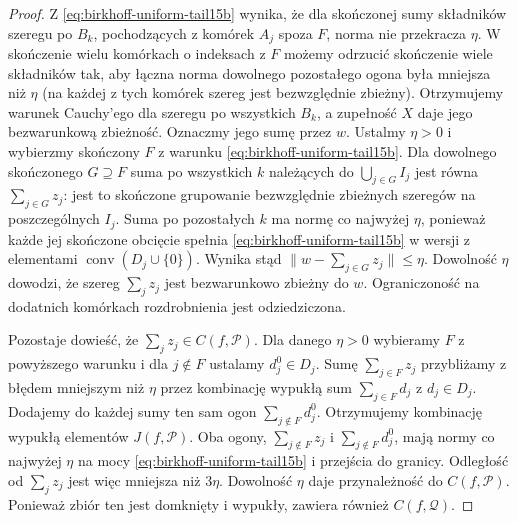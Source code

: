 \begin{proof}
Z \eqref{eq:birkhoff-uniform-tail15b} wynika, że
dla skończonej sumy składników szeregu po $B_k$,
pochodzących z komórek $A_j$ spoza $F$, norma
nie przekracza $\eta$. W skończenie wielu komórkach
o indeksach z $F$ możemy odrzucić skończenie wiele
składników tak, aby łączna norma dowolnego
pozostałego ogona była mniejsza niż $\eta$
(na każdej z tych komórek szereg jest bezwzględnie
zbieżny). Otrzymujemy warunek Cauchy'ego
dla szeregu po wszystkich $B_k$, a zupełność $X$
daje jego bezwarunkową zbieżność. Oznaczmy jego
sumę przez $w$. Ustalmy $\eta>0$ i wybierzmy
skończony $F$ z warunku \eqref{eq:birkhoff-uniform-tail15b}.
Dla dowolnego skończonego $G\supseteq F$
suma po wszystkich $k$ należących do $\bigcup_{j\in G}I_j$
jest równa $\sum_{j\in G}z_j$: jest to skończone
grupowanie bezwzględnie zbieżnych szeregów na
poszczególnych $I_j$. Suma po pozostałych $k$
ma normę co najwyżej $\eta$, ponieważ każde jej
skończone obcięcie spełnia
\eqref{eq:birkhoff-uniform-tail15b} w wersji
z elementami $\operatorname{conv}(D_j\cup\{0\})$.
Wynika stąd $\|w-\sum_{j\in G}z_j\|\le\eta$.
Dowolność $\eta$ dowodzi, że szereg $\sum_jz_j$
jest bezwarunkowo zbieżny do $w$. Ograniczoność
na dodatnich komórkach rozdrobnienia jest odziedziczona.

Pozostaje dowieść, że $\sum_jz_j\in C(f,\mathcal P)$.
Dla danego $\eta>0$ wybieramy $F$ z powyższego
warunku i dla $j\notin F$ ustalamy $d_j^0\in D_j$.
Sumę $\sum_{j\in F}z_j$ przybliżamy z błędem
mniejszym niż $\eta$ przez kombinację wypukłą
sum $\sum_{j\in F}d_j$ z $d_j\in D_j$.
Dodajemy do każdej sumy ten sam ogon
$\sum_{j\notin F}d_j^0$. Otrzymujemy kombinację
wypukłą elementów $J(f,\mathcal P)$. Oba ogony,
$\sum_{j\notin F}z_j$ i $\sum_{j\notin F}d_j^0$,
mają normy co najwyżej $\eta$ na mocy
\eqref{eq:birkhoff-uniform-tail15b} i przejścia
do granicy. Odległość od $\sum_jz_j$ jest więc
mniejsza niż $3\eta$. Dowolność $\eta$ daje
przynależność do $C(f,\mathcal P)$. Ponieważ
zbiór ten jest domknięty i wypukły, zawiera
również $C(f,\mathcal Q)$.
\end{proof}

